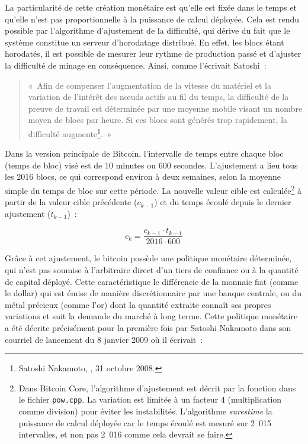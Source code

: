 La particularité de cette création monétaire est qu'elle est fixée dans le temps et qu'elle n'est pas proportionnelle à la puissance de calcul déployée. Cela est rendu possible par l'algorithme d'ajustement de la difficulté, qui dérive du fait que le système constitue un serveur d'horodatage distribué. En effet, les blocs étant horodatés, il est possible de mesurer leur rythme de production passé et d'ajuster la difficulté de minage en conséquence. Ainsi, comme l'écrivait Satoshi~:

\begin{quote}
«~Afin de compenser l'augmentation de la vitesse du matériel et la variation de l'intérêt des nœuds actifs au fil du temps, la difficulté de la preuve de travail est déterminée par une moyenne mobile visant un nombre moyen de blocs par heure. Si ces blocs sont générés trop rapidement, la difficulté augmente\footnote{Satoshi Nakamoto, , 31 octobre 2008.}.~»
\end{quote}

Dans la version principale de Bitcoin, l'intervalle de temps entre chaque bloc (temps de bloc) visé est de 10 minutes ou 600 secondes. L'ajustement a lieu tous les 2016 blocs, ce qui correspond environ à deux semaines, selon la moyenne simple du temps de bloc sur cette période. La nouvelle valeur cible est calculée\footnote{Dans Bitcoin Core, l'algorithme d'ajustement est décrit par la fonction  dans le fichier \texttt{pow.cpp}. La variation est limitée à un facteur 4 (multiplication comme division) pour éviter les instabilités. L'algorithme \emph{surestime} la puissance de calcul déployée car le temps écoulé est mesuré sur 2~015 intervalles, et non pas 2~016 comme cela devrait se faire.} à partir de la valeur cible précédente ($c_{k-1}$) et du temps écoulé depuis le dernier ajustement ($t_{k-1}$)~:

{ \footnotesize
\[
c_{k} = \frac{c_{k-1} \cdot t_{k-1}}{2016 \cdot 600}
\]
}

Grâce à cet ajustement, le bitcoin possède une politique monétaire déterminée, qui n'est pas soumise à l'arbitraire direct d'un tiers de confiance ou à la quantité de capital déployé. Cette caractéristique le différencie de la monnaie fiat (comme le dollar) qui est émise de manière discrétionnaire par une banque centrale, ou du métal précieux (comme l'or) dont la quantité extraite connaît ses propres variations et suit la demande du marché à long terme. Cette politique monétaire a été décrite précisément pour la première fois par Satoshi Nakamoto dans son courriel de lancement du 8 janvier 2009 où il écrivait~:

